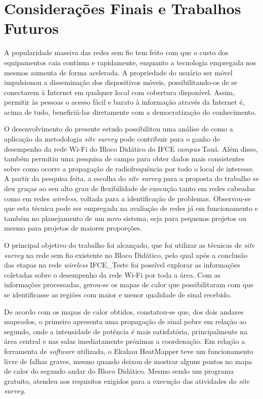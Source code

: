 \chapter{Considerações Finais e Trabalhos Futuros}
\label{cap:conclusoes-e-trabalhos-futuros}

A popularidade massiva das redes sem fio tem feito com que o custo dos equipamentos caia contínua e rapidamente, enquanto a tecnologia empregada nos mesmos aumenta de forma acelerada. A propriedade do usuário ser móvel impulsionou a disseminação dos dispositivos móveis, possibilitando-os de se conectarem à Internet em qualquer local com cobertura disponível. Assim, permitir às pessoas o acesso fácil e barato à informação através da Internet é, acima de tudo, beneficiá-las diretamente com a democratização do conhecimento.

O desenvolvimento do presente estudo possibilitou uma análise de como a aplicação da metodologia \textit{site survey} pode contribuir para o ganho de desempenho da rede Wi-Fi do Bloco Didático do IFCE \textit{campus} Tauá. Além disso, também permitiu uma pesquisa de campo para obter dados mais consistentes sobre como ocorre a propagação de radiofrequência por todo o local de interesse.
A partir da pesquisa feita, a escolha do \textit{site survey} para a proposta do trabalho se deu graças ao seu alto grau de flexibilidade de execução tanto em redes cabeadas como em redes \textit{wireless}, voltada para a identificação de problemas. Observou-se que esta técnica pode ser empregada na avaliação de redes já em funcionamento e também no planejamento de um novo sistema, seja para pequenos projetos ou mesmo para projetos de maiores proporções.

O principal objetivo do trabalho foi alcançado, que foi utilizar as técnicas de \textit{site survey} na rede sem fio existente no Bloco Didático, pelo qual após a conclusão das etapas na rede \textit{wireless} IFCE\_Teste foi possível explorar as informações coletadas sobre o desempenho da rede Wi-Fi por toda a área. Com as informações processadas, gerou-se os mapas de calor que possibilitaram com que se identificasse as regiões com maior e menor qualidade de sinal recebido.

De acordo com os mapas de calor obtidos, constatou-se que, dos dois andares mapeados, o primeiro apresenta uma propagação de sinal pobre em relação ao segundo, onde a intensidade de potência é mais satisfatória, principalmente na área central e nas salas imediatamente próximas a coordenação.
Em relação a ferramenta de \textit{software} utilizada, o Ekahau HeatMapper teve um funcionamento livre de falhas graves, mesmo quando deixou de mostrar alguns pontos no mapa de calor do segundo andar do Bloco Didático. Mesmo sendo um programa gratuito, atendeu aos requisitos exigidos para a execução das atividades do \textit{site survey}.

